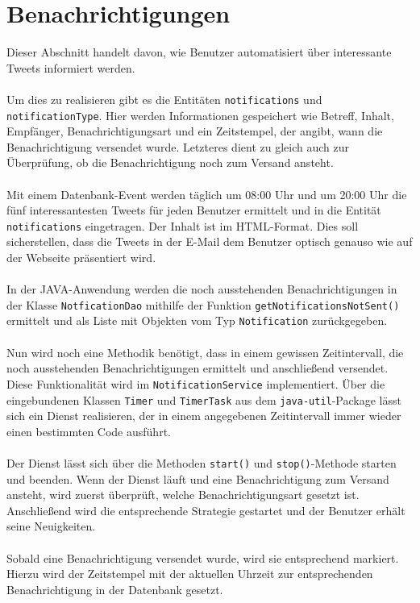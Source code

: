 \section{Benachrichtigungen}

Dieser Abschnitt handelt davon, wie Benutzer automatisiert über interessante Tweets informiert werden.
\\\\
Um dies zu realisieren gibt es die Entitäten \texttt{notifications} und \texttt{notificationType}. Hier werden Informationen gespeichert wie Betreff, Inhalt, Empfänger, Benachrichtigungsart und ein Zeitstempel, der angibt, wann die Benachrichtigung versendet wurde. Letzteres dient zu gleich auch zur Überprüfung, ob die Benachrichtigung noch zum Versand ansteht.
\\\\
Mit einem Datenbank-Event werden täglich um 08:00 Uhr und um 20:00 Uhr die fünf interessantesten Tweets für jeden Benutzer ermittelt und in die Entität \texttt{notifications} eingetragen. Der Inhalt ist im \acs{HTML}-Format. Dies soll sicherstellen, dass die Tweets in der E-Mail dem Benutzer optisch genauso wie auf der Webseite präsentiert wird.
\\\\
In der JAVA-Anwendung werden die noch ausstehenden Benachrichtigungen in der Klasse \texttt{NotficationDao} mithilfe der Funktion \texttt{getNotificationsNotSent()} ermittelt und als Liste mit Objekten vom Typ \texttt{Notification} zurückgegeben.
\\\\
Nun wird noch eine Methodik benötigt, dass in einem gewissen Zeitintervall, die noch ausstehenden Benachrichtigungen ermittelt und anschließend versendet. Diese Funktionalität wird im \texttt{NotificationService} implementiert. Über die eingebundenen Klassen \texttt{Timer} und \texttt{TimerTask} aus dem \texttt{java-util}-Package lässt sich ein Dienst realisieren, der in einem angegebenen Zeitintervall immer wieder einen bestimmten Code ausführt.
\\\\
Der Dienst lässt sich über die Methoden \texttt{start()} und \texttt{stop()}-Methode starten und beenden. Wenn der Dienst läuft und eine Benachrichtigung zum Versand ansteht, wird zuerst überprüft, welche Benachrichtigungsart gesetzt ist. Anschließend wird die entsprechende Strategie gestartet und der Benutzer erhält seine Neuigkeiten.
\\\\
Sobald eine Benachrichtigung versendet wurde, wird sie entsprechend markiert. Hierzu wird der Zeitstempel mit der aktuellen Uhrzeit zur entsprechenden Benachrichtigung in der Datenbank gesetzt.

